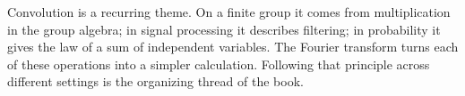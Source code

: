 Convolution is a recurring theme. On a finite group it comes from multiplication
in the group algebra; in signal processing it describes filtering; in
probability it gives the law of a sum of independent variables. The Fourier
transform turns each of these operations into a simpler calculation. Following
that principle across different settings is the organizing thread of the book.

